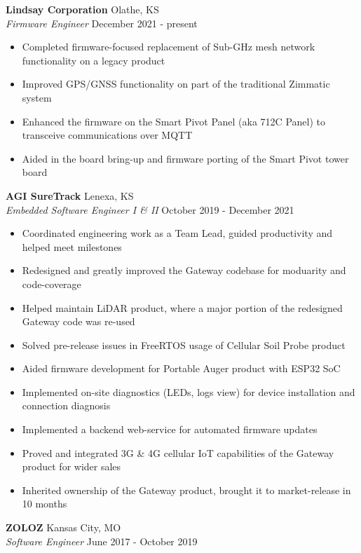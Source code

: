 \documentclass[a4paper]{article}
\begin{document}
\textbf{Lindsay Corporation} \hfill Olathe, KS\\
\textit{Firmware Engineer} \hfill December 2021 - present\\
\vspace{-1mm}
\begin{itemize} \itemsep 1pt
	\item Completed firmware-focused replacement of Sub-GHz mesh network functionality on a legacy product
	\item Improved GPS/GNSS functionality on part of the traditional Zimmatic system
	\item Enhanced the firmware on the Smart Pivot Panel (aka 712C Panel) to transceive communications over MQTT
	\item Aided in the board bring-up and firmware porting of the Smart Pivot tower board
\end{itemize}
\textbf{AGI SureTrack} \hfill Lenexa, KS\\
\textit{Embedded Software Engineer I \& II} \hfill October 2019 - December 2021\\
\vspace{-1mm}
\begin{itemize} \itemsep 1pt
	\item Coordinated engineering work as a Team Lead, guided productivity and helped meet milestones
	\item Redesigned and greatly improved the Gateway codebase for moduarity and code-coverage
	\item Helped maintain LiDAR product, where a major portion of the redesigned Gateway code was re-used
	\item Solved pre-release issues in FreeRTOS usage of Cellular Soil Probe product
	\item Aided firmware development for Portable Auger product with ESP32 SoC
	\item Implemented on-site diagnostics (LEDs, logs view) for device installation and connection diagnosis
	\item Implemented a backend web-service for automated firmware updates
	\item Proved and integrated 3G \& 4G cellular IoT capabilities of the Gateway product for wider sales
	\item Inherited ownership of the Gateway product, brought it to market-release in 10 months
\end{itemize}
\textbf{ZOLOZ} \hfill Kansas City, MO\\
\textit{Software Engineer} \hfill June 2017 - October 2019\\
\end{document}
